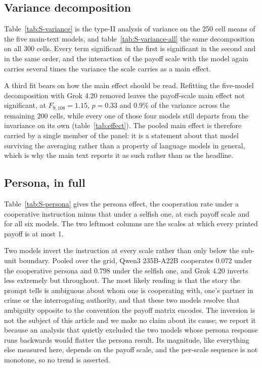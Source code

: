 \documentclass[11pt,a4paper]{article}
\begin{document}
\subsection{Variance decomposition}\label{appendix:variance}

Table~\ref{tab:S-variance} is the type-II analysis of variance on the 250 cell
means of the five main-text models, and table~\ref{tab:S-variance-all} the same
decomposition on all 300 cells. Every term significant in the first is
significant in the second and in the same order, and the interaction of the
payoff scale with the model again carries several times the variance the scale
carries as a main effect.

A third fit bears on how the main effect should be read. Refitting the
five-model decomposition with Grok 4.20 removed leaves the payoff-scale main
effect not significant, at $F_{9,108} = 1.15$, $p = 0.33$ and $0.9\%$ of the
variance across the remaining 200 cells, while every one of those four models
still departs from the invariance on its own (table~\ref{tab:effect}). The
pooled main effect is
therefore carried by a single member of the panel: it is a statement about that
model surviving the averaging rather than a property of language models in
general, which is why the main text reports it as such rather than as the
headline.

\subsection{Persona, in full}\label{appendix:persona_full}

Table~\ref{tab:S-persona} gives the persona effect, the cooperation rate under
a cooperative instruction minus that under a selfish one, at each payoff scale
and for all six models. The two leftmost columns are the scales at which every
printed payoff is at most 1.

Two models invert the instruction at every scale rather than only below the
sub-unit boundary. Pooled over the grid, Qwen3 235B-A22B cooperates 0.072 under
the cooperative persona and 0.798 under the selfish one, and Grok 4.20 inverts
less extremely but throughout. The most likely reading is that the story the
prompt tells is ambiguous about whom one is cooperating with, one's partner in
crime or the interrogating authority, and that these two models resolve that
ambiguity opposite to the convention the payoff matrix encodes. The inversion
is not the subject of this article and we make no claim about its cause; we
report it because an analysis that quietly excluded the two models whose
persona response runs backwards would flatter the persona result. Its
magnitude, like everything else measured here, depends on the payoff scale, and
the per-scale sequence is not monotone, so no trend is asserted.
\end{document}
